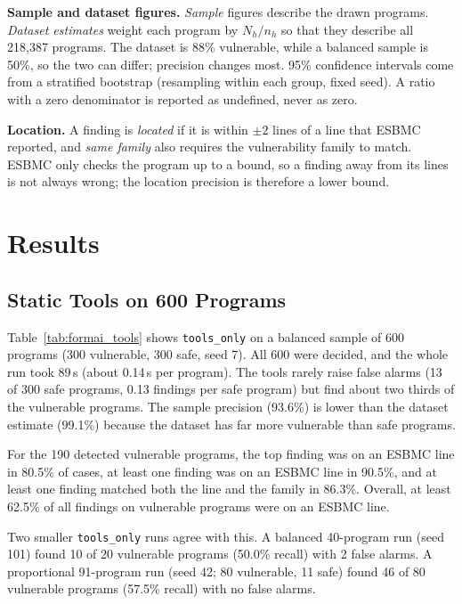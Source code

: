 \documentclass[conference]{IEEEtran}
\begin{document}
\textbf{Sample and dataset figures.} \emph{Sample} figures describe the drawn
programs. \emph{Dataset estimates} weight each program by $N_h/n_h$ so that they
describe all 218,387 programs. The dataset is 88\% vulnerable, while a balanced
sample is 50\%, so the two can differ; precision changes most. 95\% confidence
intervals come from a stratified bootstrap (resampling within each group, fixed
seed). A ratio with a zero denominator is reported as undefined, never as zero.

\textbf{Location.} A finding is \emph{located} if it is within $\pm2$ lines of a
line that ESBMC reported, and \emph{same family} also requires the vulnerability
family to match. ESBMC only checks the program up to a bound, so a finding away
from its lines is not always wrong; the location precision is therefore a lower
bound.

\section{Results}

\subsection{Static Tools on 600 Programs}
Table~\ref{tab:formai_tools} shows \texttt{tools\_only} on a balanced sample of
600 programs (300 vulnerable, 300 safe, seed 7). All 600 were decided, and the
whole run took 89\,s (about 0.14\,s per program). The tools rarely raise false
alarms (13 of 300 safe programs, 0.13 findings per safe program) but find about
two thirds of the vulnerable programs. The sample precision (93.6\%) is lower
than the dataset estimate (99.1\%) because the dataset has far more vulnerable
than safe programs.

For the 190 detected vulnerable programs, the top finding was on an ESBMC line in
80.5\% of cases, at least one finding was on an ESBMC line in 90.5\%, and at least
one finding matched both the line and the family in 86.3\%. Overall, at least
62.5\% of all findings on vulnerable programs were on an ESBMC line.

Two smaller \texttt{tools\_only} runs agree with this. A balanced 40-program run
(seed 101) found 10 of 20 vulnerable programs (50.0\% recall) with 2 false
alarms. A proportional 91-program run (seed 42; 80 vulnerable, 11 safe) found
46 of 80 vulnerable programs (57.5\% recall) with no false alarms.
\end{document}
